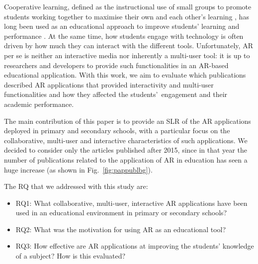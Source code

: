 Cooperative learning, defined as the instructional use of small groups to promote students working together to maximise their own and each other's learning \citep{johnson1991cooperation}, has long been used as an educational approach to improve students' learning and performance \citep{johnson2008active, kuh2011piecing}. At the same time, how students engage with technology is often driven by how much they can interact with the different tools. Unfortunately, AR per se is neither an interactive media nor inherently a multi-user tool: it is up to researchers and developers to provide such functionalities in an AR-based educational application. With this work, we aim to evaluate which publications described AR applications that provided interactivity and multi-user functionalities and how they affected the students'\ engagement and their academic performance.

The main contribution of this paper is to provide an \gls{SLR} of the \gls{AR} applications deployed in primary and secondary schools, with a particular focus on the collaborative, multi-user and interactive characteristics of such applications. We decided to consider only the articles published after 2015, since in that year the number of publications related to the application of \gls{AR} in education has seen a huge increase (as shown in Fig.~\ref{fig:pappublbg}).

The \gls{RQ} that we addressed with this study are:
\begin{itemize}
    \item \gls{RQ}1: What collaborative, multi-user, interactive \gls{AR} applications have been used in an educational environment in primary or secondary schools?
    \item \gls{RQ}2: What was the motivation for using \gls{AR} as an educational tool?
    \item \gls{RQ}3: How effective are \gls{AR} applications at improving the students' knowledge of a subject? How is this evaluated?
\end{itemize}

